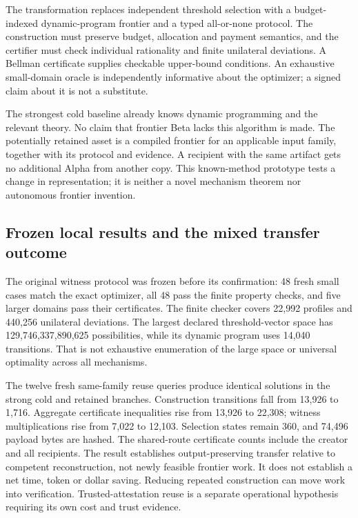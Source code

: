\documentclass[11pt,letterpaper]{article}
\begin{document}
The transformation replaces independent threshold selection with a
budget-indexed dynamic-program frontier and a typed all-or-none protocol.
The construction must preserve budget, allocation and payment semantics, and
the certifier must check individual rationality and finite unilateral deviations.
A Bellman certificate supplies checkable upper-bound conditions. An exhaustive
small-domain oracle is independently informative about the optimizer; a signed
claim about it is not a substitute.

The strongest cold baseline already knows dynamic programming and the relevant
theory. No claim that frontier Beta lacks this algorithm is made. The potentially
retained asset is a compiled frontier for an applicable input family, together
with its protocol and evidence. A recipient with the same artifact gets no
additional Alpha from another copy.
This known-method prototype tests a change in representation; it is neither a
novel mechanism theorem nor autonomous frontier invention.

\subsection{Frozen local results and the mixed transfer outcome}

The original witness protocol was frozen before its confirmation: 48 fresh small
cases match the exact optimizer, all 48 pass the finite property checks, and five
larger domains pass their certificates. The finite checker covers 22,992 profiles
and 440,256 unilateral deviations. The largest declared threshold-vector space
has 129,746,337,890,625 possibilities, while its dynamic program uses 14,040
transitions. That is not exhaustive enumeration of the large space or universal
optimality across all mechanisms.

The twelve fresh same-family reuse queries produce identical solutions in the
strong cold and retained branches. Construction transitions fall from 13,926 to
1,716. Aggregate certificate inequalities rise from 13,926 to 22,308; witness
multiplications rise from 7,022 to 12,103. Selection states remain 360, and
74,496 payload bytes are hashed. The shared-route certificate counts include
the creator and all recipients. The result establishes output-preserving
transfer relative to competent reconstruction, not newly feasible frontier work.
It does not establish a net time, token or dollar saving. Reducing repeated
construction can move work into verification.
Trusted-attestation reuse is a separate operational hypothesis requiring its own
cost and trust evidence.
\end{document}
